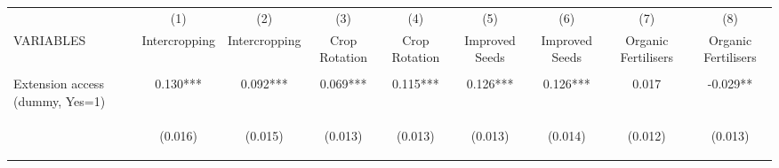 \begin{center}
\begin{tabular}{lcccccccc} \hline
 & (1) & (2) & (3) & (4) & (5) & (6) & (7) & (8) \\
VARIABLES & Intercropping & Intercropping & Crop Rotation & Crop Rotation & Improved Seeds & Improved Seeds & Organic Fertilisers & Organic Fertilisers \\ \hline
\vspace{4pt} & \begin{footnotesize}\end{footnotesize} & \begin{footnotesize}\end{footnotesize} & \begin{footnotesize}\end{footnotesize} & \begin{footnotesize}\end{footnotesize} & \begin{footnotesize}\end{footnotesize} & \begin{footnotesize}\end{footnotesize} & \begin{footnotesize}\end{footnotesize} & \begin{footnotesize}\end{footnotesize} \\
Extension access (dummy, Yes=1) & 0.130*** & 0.092*** & 0.069*** & 0.115*** & 0.126*** & 0.126*** & 0.017 & -0.029** \\
\vspace{4pt} & \begin{footnotesize}(0.016)\end{footnotesize} & \begin{footnotesize}(0.015)\end{footnotesize} & \begin{footnotesize}(0.013)\end{footnotesize} & \begin{footnotesize}(0.013)\end{footnotesize} & \begin{footnotesize}(0.013)\end{footnotesize} & \begin{footnotesize}(0.014)\end{footnotesize} & \begin{footnotesize}(0.012)\end{footnotesize} & \begin{footnotesize}(0.013)\end{footnotesize} \\

\end{tabular}
\end{center}
